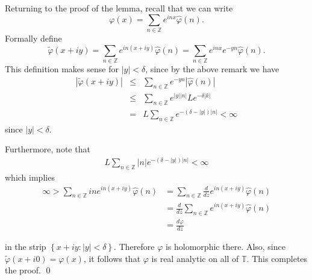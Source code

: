 \documentclass{beamer}
\numberwithin{equation}{section}
\newcommand{\ci}{\mathbb{T}}
\newcommand{\wh}{\widehat}
\newcommand{\vp}{\varphi}
\begin{document}
\begin{frame}
Returning to the proof of the lemma, recall that we can write
\[\varphi(x)=\sum_{n\in \mathbb{Z}}e^{inx}\hat{\varphi}(n).\]
Formally define 
\[\tilde{\varphi}(x+iy)=\sum_{n\in \mathbb{Z}}e^{in(x+iy)}\hat{\varphi}(n)
=\sum_{n\in \mathbb{Z}}e^{inx}e^{-yn}\hat{\varphi}(n).\]
%
%
This definition makes sense for $|y|< \delta$, since by the above remark we have
\begin{eqnarray*}
|\tilde{\varphi}(x+iy)|&\le& \sum_{n\in \mathbb{Z}}e^{-yn}|\hat{\varphi}(n)|
\\
&\le& 
\sum_{n\in \mathbb{Z}}e^{|y| |n|}L e^{-\delta |k|}\\
&=&L \sum_{n\in \mathbb{Z}}e^{-(\delta -|y|) |n|}< \infty
\end{eqnarray*} 
since $|y|< \delta$. 
\end{frame}
\begin{frame}
Furthermore, note that
%
%
\begin{equation*}
\begin{split}
  L \sum_{n \in \mathbb{Z}}| n | e^{-(\delta -|y|) |n|}< \infty
\end{split}
\end{equation*}
%
which implies
\begin{equation*}
\begin{split}
  \infty > \sum_{n \in \mathbb{Z}} i n  e^{in(x + iy)}  \wh{\vp}(n) 
  & = \sum_{n \in \mathbb{Z}} \frac{d}{dz}  e^{in(x + iy)}  \wh{\vp}(n) 
  \\
  & = \frac{d}{dz}\sum_{n \in \mathbb{Z}} e^{in(x + iy)}  \wh{\vp}(n) 
  \\
  & = \frac{d \vp}{dz}
\end{split}
\end{equation*}

%
in the strip $\left\{ x+ iy: | y | < \delta \right\}$. Therefore $\vp$ is
holomorphic there. Also, since $\tilde{\varphi}(x+i0)=\varphi(x)$,
it follows that $\vp$ is real analytic on all of $\ci$.
This completes the proof. \qed
\end{frame}
%
%
%
%
%
\end{document}
